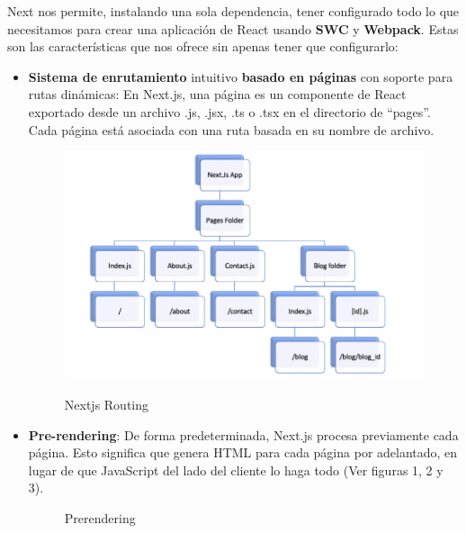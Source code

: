 \documentclass[12pt,twoside,titlepage]{report}
\begin{document}
Next nos permite, instalando una sola dependencia, tener configurado todo lo que necesitamos para crear una aplicación de React usando \textbf{SWC} y \textbf{Webpack}. Estas son las características que nos ofrece sin apenas tener que configurarlo:

\begin{itemize}
    \item \textbf{Sistema de enrutamiento} intuitivo \textbf{basado en páginas} con soporte para rutas dinámicas: En Next.js, una página es un componente de React exportado desde un archivo .js, .jsx, .ts o .tsx en el directorio de ``pages''. Cada página está asociada con una ruta basada en su nombre de archivo.
    \begin{figure}[H]
        \centering
        \includegraphics[scale=0.3]{Nextjs/Routing}
        \label{fig:nextjs_routing}
        \caption{Nextjs Routing}
    \end{figure}
    
    \item \textbf{Pre-rendering}: De forma predeterminada, Next.js procesa previamente cada página. Esto significa que genera HTML para cada página por adelantado, en lugar de que JavaScript del lado del cliente lo haga todo (Ver figuras 1, 2 y 3). 
    \begin{figure}[H]
        \centering
        \caption{Prerendering}
        \label{f:Prerendering}
       \end{figure}


\end{itemize}
\end{document}
